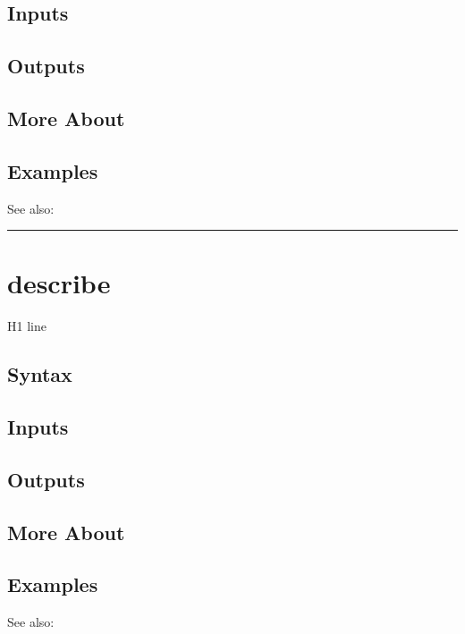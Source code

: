 \documentclass[letterpaper,10pt,english]{sphinxmanual}
\begin{document}
\subsection{Inputs}
\label{classes/time_series/@ts/ts:id175}

\subsection{Outputs}
\label{classes/time_series/@ts/ts:id176}

\subsection{More About}
\label{classes/time_series/@ts/ts:id177}

\subsection{Examples}
\label{classes/time_series/@ts/ts:id178}
See also:


\bigskip\hrule{}\bigskip



\section{describe}
\label{classes/time_series/@ts/ts:describe}\label{classes/time_series/@ts/ts:id179}
H1 line


\subsection{Syntax}
\label{classes/time_series/@ts/ts:id180}

\subsection{Inputs}
\label{classes/time_series/@ts/ts:id181}

\subsection{Outputs}
\label{classes/time_series/@ts/ts:id182}

\subsection{More About}
\label{classes/time_series/@ts/ts:id183}

\subsection{Examples}
\label{classes/time_series/@ts/ts:id184}
See also:
\end{document}
